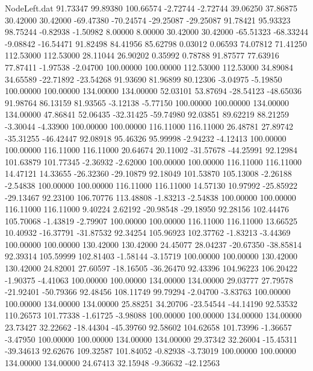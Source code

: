 \begin{filecontents}{NodeLeft.dat}
  91.73347   99.89380  100.66574    -2.72744   -2.72744   39.06250   37.86875   30.42000   30.42000  -69.47380  -70.24574  -29.25087  -29.25087
  91.78421   95.93323   98.75244    -0.82938   -1.50982    8.00000    8.00000   30.42000   30.42000  -65.51323  -68.33244   -9.08842  -16.54471
  91.82498   84.41956   85.62798     0.03012    0.06593   74.07812   71.41250  112.53000  112.53000   28.11044   26.90202    0.35992    0.78788
  91.87577   77.63916   77.87411    -1.97538   -2.04700  100.00000  100.00000  112.53000  112.53000   34.89084   34.65589  -22.71892  -23.54268
  91.93690   81.96899   80.12306    -3.04975   -5.19850  100.00000  100.00000  134.00000  134.00000   52.03101   53.87694  -28.54123  -48.65036
  91.98764   86.13159   81.93565    -3.12138   -5.77150  100.00000  100.00000  134.00000  134.00000   47.86841   52.06435  -32.31425  -59.74980
  92.03851   89.62219   88.21259    -3.30044   -4.33900  100.00000  100.00000  116.11000  116.11000   26.48781   27.89742  -35.31255  -46.42447
  92.08918   95.46326   95.99998    -2.94232   -4.12413  100.00000  100.00000  116.11000  116.11000   20.64674   20.11002  -31.57678  -44.25991
  92.12984  101.63879  101.77345    -2.36932   -2.62000  100.00000  100.00000  116.11000  116.11000   14.47121   14.33655  -26.32360  -29.10879
  92.18049  101.53870  105.13008    -2.26188   -2.54838  100.00000  100.00000  116.11000  116.11000   14.57130   10.97992  -25.85922  -29.13467
  92.23100  106.70776  113.48808    -1.83213   -2.54838  100.00000  100.00000  116.11000  116.11000    9.40224    2.62192  -20.98548  -29.18950
  92.28156  102.44476  105.70068    -1.43819   -2.79907  100.00000  100.00000  116.11000  116.11000   13.66525   10.40932  -16.37791  -31.87532
  92.34254  105.96923  102.37762    -1.83213   -3.44369  100.00000  100.00000  130.42000  130.42000   24.45077   28.04237  -20.67350  -38.85814
  92.39314  105.59999  102.81403    -1.58144   -3.15719  100.00000  100.00000  130.42000  130.42000   24.82001   27.60597  -18.16505  -36.26470
  92.43396  104.96223  106.20422    -1.90375   -4.41063  100.00000  100.00000  134.00000  134.00000   29.03777   27.79578  -21.92401  -50.79366
  92.48456  108.11749   99.79294    -2.04700   -3.83763  100.00000  100.00000  134.00000  134.00000   25.88251   34.20706  -23.54544  -44.14190
  92.53532  110.26573  101.77338    -1.61725   -3.98088  100.00000  100.00000  134.00000  134.00000   23.73427   32.22662  -18.44304  -45.39760
  92.58602  104.62658  101.73996    -1.36657   -3.47950  100.00000  100.00000  134.00000  134.00000   29.37342   32.26004  -15.45311  -39.34613
  92.62676  109.32587  101.84052    -0.82938   -3.73019  100.00000  100.00000  134.00000  134.00000   24.67413   32.15948   -9.36632  -42.12563

\end{filecontents}
